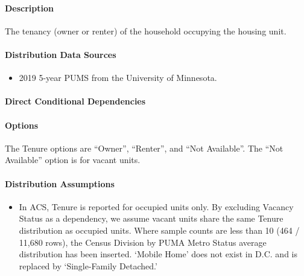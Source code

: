 \paragraph{Description}
% 
The tenancy (owner or renter) of the household occupying the housing
unit.

\paragraph{Distribution Data Sources}
% 
\begin{itemize}
\item
  2019 5-year PUMS from the University of Minnesota.
\end{itemize}

\paragraph{Direct Conditional Dependencies}


\paragraph{Options}
The Tenure options are ``Owner'', ``Renter'', and ``Not Available''. The ``Not Available'' option is for vacant units.

\paragraph{Distribution Assumptions}
% 
\begin{itemize}
\item
  In ACS, Tenure is reported for occupied units only. By excluding
  Vacancy Status as a dependency, we assume vacant units share the same
  Tenure distribution as occupied units. Where sample counts are less
  than 10 (464 / 11,680 rows), the Census Division by PUMA Metro Status
  average distribution has been inserted. `Mobile
  Home' does not exist in D.C. and is replaced by
  `Single-Family Detached.'
\end{itemize}
